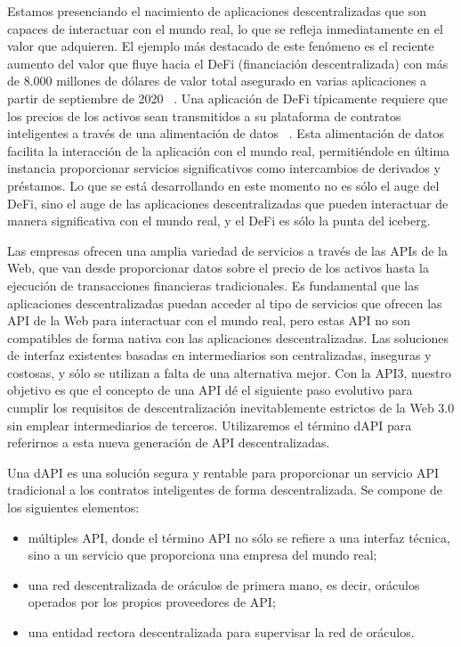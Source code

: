 \documentclass[11pt]{article}
\begin{document}
Estamos presenciando el nacimiento de aplicaciones descentralizadas que son capaces de interactuar con el mundo real, lo que se refleja inmediatamente en el valor que adquieren. El ejemplo más destacado de este fenómeno es el reciente aumento del valor que fluye hacia el DeFi (financiación descentralizada) con más de 8.000 millones de dólares de valor total asegurado en varias aplicaciones a partir de septiembre de 2020 ~\cite{defipulse}.
Una aplicación de DeFi típicamente requiere que los precios de los activos sean transmitidos a su plataforma de contratos inteligentes a través de una alimentación de datos ~\cite{liu:2020}.
Esta alimentación de datos facilita la interacción de la aplicación con el mundo real, permitiéndole en última instancia proporcionar servicios significativos como intercambios de derivados y préstamos. Lo que se está desarrollando en este momento no es sólo el auge del DeFi, sino el auge de las aplicaciones descentralizadas que pueden interactuar de manera significativa con el mundo real, y el DeFi es sólo la punta del iceberg.


Las empresas ofrecen una amplia variedad de servicios a través de las APIs de la Web, que van desde proporcionar datos sobre el precio de los activos hasta la ejecución de transacciones financieras tradicionales. Es fundamental que las aplicaciones descentralizadas puedan acceder al tipo de servicios que ofrecen las API de la Web para interactuar con el mundo real, pero estas API no son compatibles de forma nativa con las aplicaciones descentralizadas. Las soluciones de interfaz existentes basadas en intermediarios son centralizadas, inseguras y costosas, y sólo se utilizan a falta de una alternativa mejor. Con la API3, nuestro objetivo es que el concepto de una API dé el siguiente paso evolutivo para cumplir los requisitos de descentralización inevitablemente estrictos de la Web 3.0 sin emplear intermediarios de terceros. Utilizaremos el término dAPI para referirnos a esta nueva generación de API descentralizadas.

Una dAPI es una solución segura y rentable para proporcionar un servicio API tradicional a los contratos inteligentes de forma descentralizada. Se compone de los siguientes elementos:
\begin{itemize}
    \item múltiples API, donde el término API no sólo se refiere a una interfaz técnica, sino a un servicio que proporciona una empresa del mundo real;
    \item una red descentralizada de oráculos de primera mano, es decir, oráculos operados por los propios proveedores de API;
    \item una entidad rectora descentralizada para supervisar la red de oráculos.
\end{itemize}
\end{document}
